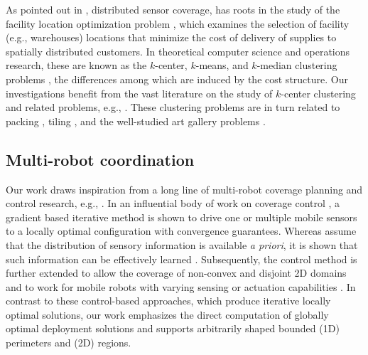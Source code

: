 As pointed out in \cite{cortes2004coverage,schwager2009decentralized}, 
distributed sensor coverage, has roots in the study 
of the facility location optimization problem 
\cite{weber1929theory,drezner1995facility}, which examines the selection 
of facility (e.g., warehouses) locations that minimize the cost of delivery 
of supplies to spatially distributed customers. In theoretical computer 
science and operations research, these are known as the $k$-center, 
$k$-means, and $k$-median clustering problems \cite{har2011geometric}, 
the differences among which are induced by the cost structure. Our 
investigations benefit from the vast literature on 
the study of $k$-center clustering and related problems, e.g., 
\cite{feder1988optimal,hochbaum1985best,gonzalez1985clustering,daskin2000new,shamos1975closest}.
%
These clustering problems are in turn related to packing 
\cite{hales2005proof}, tiling \cite{thue1910dichteste}, and the 
well-studied art gallery problems \cite{o1987art,shermer1992recent}.

\subsection{Multi-robot coordination} 
Our work draws inspiration from a long line of multi-robot coverage planning and 
control research, e.g., \cite{cortes2004coverage,martinez2007motion,
schwager2009optimal,pavone2009equitable,schwager2009decentralized,
pierson2017adapting}. 
%
In an influential body of work on coverage control \cite{cortes2004coverage,
martinez2007motion}, a gradient based iterative method is shown to drive 
one or multiple mobile sensors to a locally optimal configuration with 
convergence guarantees. 
%
Whereas \cite{cortes2004coverage,martinez2007motion} assume that the 
distribution of sensory information is available {\em a priori}, it is 
shown that such information can be effectively learned 
\cite{schwager2009decentralized}. 
%
Subsequently, the control method is further extended to allow the 
coverage of non-convex and disjoint 2D domains \cite{schwager2009optimal} 
and to work for mobile robots with varying sensing or actuation capabilities
\cite{pierson2017adapting}. 
%
In contrast to these control-based approaches, which produce iterative 
locally optimal solutions, our work emphasizes the direct computation of 
globally optimal deployment solutions and supports arbitrarily shaped
bounded (1D) perimeters and (2D) regions.

